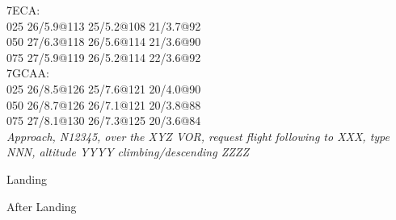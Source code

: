 \documentclass[12pt]{article}
\begin{document}
\noindent 7ECA: \\
025 26/5.9@113 25/5.2@108 21/3.7@92 \\
050 27/6.3@118 26/5.6@114 21/3.6@90 \\
075 27/5.9@119 26/5.2@114 22/3.6@92 \\

\noindent 7GCAA: \\
025 26/8.5@126 25/7.6@121 20/4.0@90 \\
050 26/8.7@126 26/7.1@121 20/3.8@88 \\
075 27/8.1@130 26/7.3@125 20/3.6@84 \\

\noindent
{\small \it Approach, N12345, over the XYZ VOR, request flight following to XXX,
type NNN, altitude YYYY climbing/descending ZZZZ} \\

\pagebreak

\centerline{{\Huge \sc Landing }}

\bigskip

\begin{center}
\end{center}

\bigskip

\centerline{{\Huge \sc After Landing }}

\bigskip

\begin{center}
\end{center}

\noindent
\hrulefill
\end{document}
